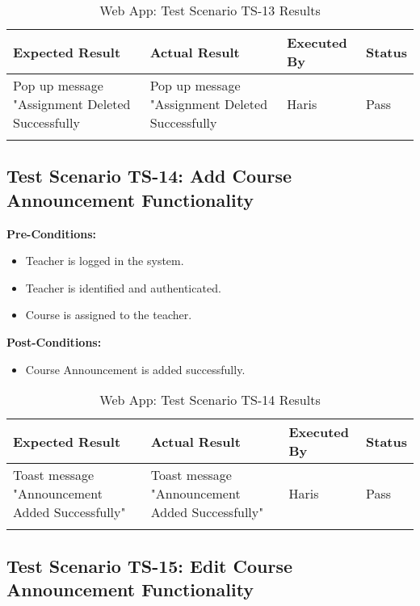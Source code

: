\bigskip


\begin{longtable}{|p{4cm}|p{4cm}|p{2cm}|p{2cm}|}
\hline
\textbf{Expected Result} & \textbf{Actual Result} & \textbf{Executed By} & \textbf{Status}\\
\hline
Pop up message "Assignment Deleted Successfully &
Pop up message "Assignment Deleted Successfully &
Haris &
Pass \\
\hline

\caption{Web App: Test Scenario TS-13 Results}
\end{longtable}



\subsection{Test Scenario TS-14: Add Course Announcement Functionality}

\textbf{Pre-Conditions: }
\begin{itemize}

\item Teacher is logged in the system.
\item Teacher is identified and authenticated.
\item Course is assigned to the teacher.

\end{itemize}

\textbf{Post-Conditions: }
\begin{itemize}

\item Course Announcement is added successfully.

\end{itemize}


\bigskip
\newpage
\begin{longtable}{|p{4cm}|p{4cm}|p{2cm}|p{2cm}|}
\hline
\textbf{Expected Result} & \textbf{Actual Result} & \textbf{Executed By} & \textbf{Status}\\
\hline
Toast message "Announcement Added Successfully" &
Toast message "Announcement Added Successfully" &
Haris &
Pass \\
\hline

\caption{Web App: Test Scenario TS-14 Results}
\end{longtable}



\subsection{Test Scenario TS-15: Edit Course Announcement Functionality}


